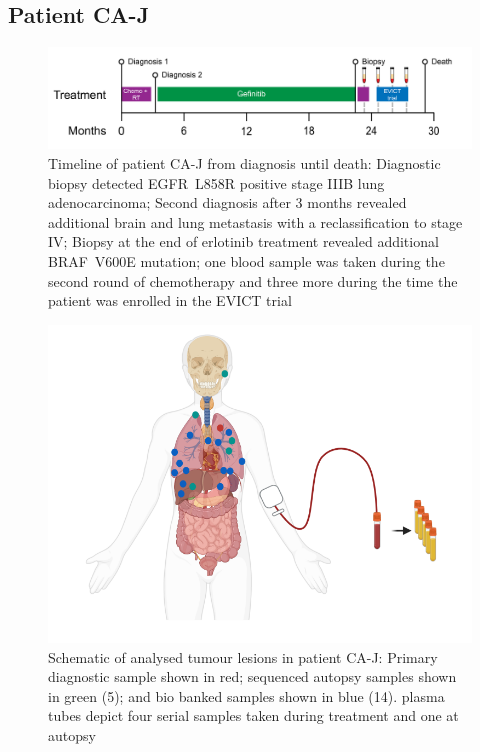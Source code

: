 \cleardoublepage

\subsection{Patient CA-J}
\label{cascade-sec:CA80}


\begin{figure}[!ht]
\centering
\includegraphics[width=.99\linewidth]{Figures/CA-J_timeline}
\caption[Timeline of patient CA-J from diagnosis until death]{Timeline of patient CA-J from diagnosis until death: Diagnostic biopsy detected EGFR~L858R positive stage IIIB lung adenocarcinoma; Second diagnosis after 3 months revealed additional brain and lung metastasis with a reclassification to stage IV; Biopsy at the end of erlotinib treatment revealed additional BRAF~V600E mutation; one blood sample was taken during the second round of chemotherapy and three more during the time the patient was enrolled in the EVICT trial} \label{fig:ca80timeline}
\end{figure}





\begin{figure}[!ht]
\centering
\includegraphics[width=.99\linewidth]{Figures/CA-J_schematic_CA80}
\caption[Schematic of analysed tumour lesions in patient CA-J]{Schematic of analysed tumour lesions in patient CA-J: Primary diagnostic sample shown in red; sequenced autopsy samples shown in green (5); and bio banked samples shown in blue (14). plasma tubes depict four serial samples taken during treatment and one at autopsy} \label{fig:cas80schematic}
\end{figure}


